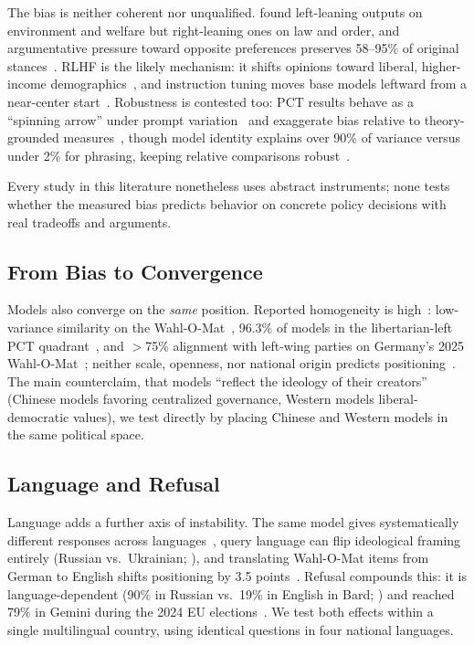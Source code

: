 \documentclass[11pt]{article}
\begin{document}
The bias is neither coherent nor unqualified.
\citet{ceron2024beyond} found left-leaning outputs on environment and welfare but right-leaning ones on law and order, and argumentative pressure toward opposite preferences preserves 58--95\% of original stances~\citep{press2025framework}.
RLHF is the likely mechanism: it shifts opinions toward liberal, higher-income demographics~\citep{santurkar2023whose}, and instruction tuning moves base models leftward from a near-center start~\citep{faulborn2025only}.
Robustness is contested too: PCT results behave as a ``spinning arrow'' under prompt variation~\citep{rottger2024political} and exaggerate bias relative to theory-grounded measures~\citep{faulborn2025only, fujimoto2023revisiting}, though model identity explains over 90\% of variance versus under 2\% for phrasing, keeping relative comparisons robust~\citep{sakhawat2026political}.

Every study in this literature nonetheless uses abstract instruments; none tests whether the measured bias predicts behavior on concrete policy decisions with real tradeoffs and arguments.

\subsection{From Bias to Convergence}

Models also converge on the \emph{same} position.
Reported homogeneity is high~\citep{rozado2024political}: low-variance similarity on the Wahl-O-Mat~\citep{rettenberger2025assessing}, 96.3\% of models in the libertarian-left PCT quadrant~\citep{sakhawat2026political}, and $>$75\% alignment with left-wing parties on Germany's 2025 Wahl-O-Mat~\citep{bleick2025cautionary}; neither scale, openness, nor national origin predicts positioning~\citep{peng2024beyond}.
The main counterclaim, that models ``reflect the ideology of their creators''~\citep{buyl2025llms} (Chinese models favoring centralized governance, Western models liberal-democratic values), we test directly by placing Chinese and Western models in the same political space.

\subsection{Language and Refusal}

Language adds a further axis of instability.
The same model gives systematically different responses across languages~\citep{nadeem2026bias}, query language can flip ideological framing entirely (Russian vs.\ Ukrainian; \citealp{languageyouask2026}), and translating Wahl-O-Mat items from German to English shifts positioning by 3.5 points~\citep{exler2025large}.
Refusal compounds this: it is language-dependent (90\% in Russian vs.\ 19\% in English in Bard; \citealp{urman2024silence}) and reached 79\% in Gemini during the 2024 EU elections~\citep{haman2024chatbots}.
We test both effects within a single multilingual country, using identical questions in four national languages.
\end{document}
